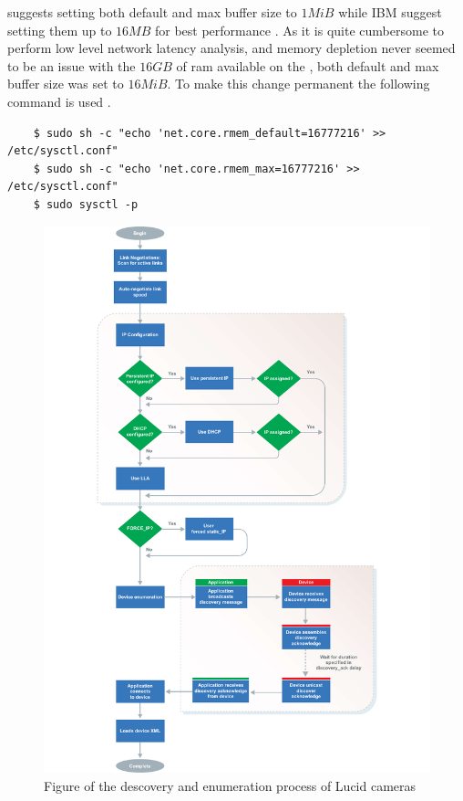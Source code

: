 \lucid suggests setting both default and max buffer size to $1MiB$ while IBM suggest setting them up to $16MB$ for best performance \cite{lucidvisionlabsReceiveBuffers2020}\cite{ibmIBMDocumentationTCPIP2021}.
As it is quite cumbersome to perform low level network latency analysis, and memory depletion never seemed to be an issue with the $16GB$ of \gls{ram} available on the \jx, both default and max buffer size was set to $16MiB$.
To make this change permanent the following command is used \cite{redhat10ChangingNetwork}.
\begin{verbatim}
    $ sudo sh -c "echo 'net.core.rmem_default=16777216' >> /etc/sysctl.conf"
    $ sudo sh -c "echo 'net.core.rmem_max=16777216' >> /etc/sysctl.conf"
    $ sudo sysctl -p
\end{verbatim}







\begin{figure}
    \centering
    \includegraphics[height=\textheight]{figures/thing.pdf}
    \caption{Figure of the descovery and enumeration process of Lucid cameras \cite{TritonMPPolarized2020}}
    \label{fig:lucid_ip_discovery}
\end{figure}